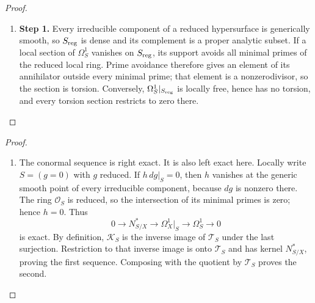 \begin{proof}
\begin{enumerate}[label={$\langle1\rangle$\arabic*.},leftmargin=*]
\item 
\noindent\textbf{Step 1.} Every irreducible component of a reduced hypersurface is generically smooth,
so $S_{\rm reg}$ is dense and its complement is a proper analytic subset.
If a local section of $\Omega^1_S$ vanishes on $S_{\rm reg}$, its support avoids
all minimal primes of the reduced local ring.  Prime avoidance therefore gives
an element of its annihilator outside every minimal prime; that element is a
nonzerodivisor, so the section is torsion.  Conversely,
$\Omega^1_S|_{S_{\rm reg}}$ is locally free, hence has no torsion, and every
torsion section restricts to zero there.

\end{enumerate}
\end{proof}

\begin{proof}
\begin{enumerate}[label={$\langle1\rangle$\arabic*.},leftmargin=*]
\item 
The conormal sequence is right exact.  It is also left exact here.  Locally
write $S=(g=0)$ with $g$ reduced.  If $h\,dg|_S=0$, then $h$ vanishes at the
generic smooth point of every irreducible component, because $dg$ is nonzero
there.  The ring $\mathcal O_S$ is reduced, so the intersection of its
minimal primes is zero; hence $h=0$.  Thus
\[
0\to N^*_{S/X}\to\Omega_X^1|_S\to\Omega_S^1\to0
\]
is exact.  By definition, $\mathscr K_S$ is the inverse image of
$\mathscr T_S$ under the last surjection.  Restriction to that inverse image
is onto $\mathscr T_S$ and has kernel $N^*_{S/X}$, proving the first
sequence.  Composing with the quotient by $\mathscr T_S$ proves the second.

\end{enumerate}
\end{proof}

